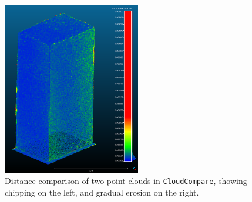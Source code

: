 \begin{figure}[h]
\begin{center}
\includegraphics[width=6cm]{diff}
\caption{Distance comparison of two point clouds in {\tt CloudCompare}, showing chipping on the left, and gradual erosion on the right.}
\end{center}
\end{figure}

